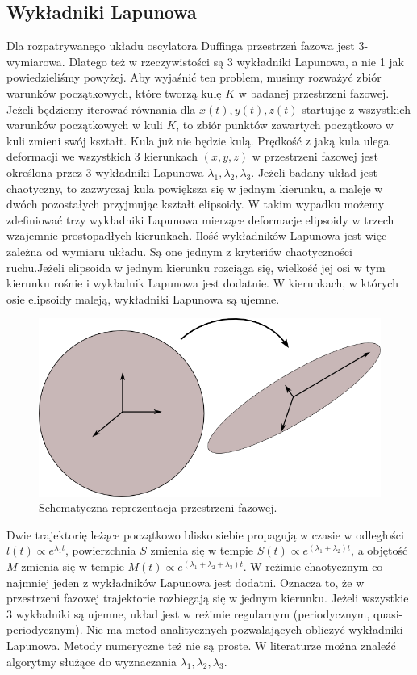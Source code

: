 \documentclass[a4paper,12pt,polish]{sphinxmanual}
\begin{document}
\subsection{Wykładniki Lapunowa}
\label{ch2/chII012:wykladniki-lapunowa}
Dla rozpatrywanego układu oscylatora Duffinga przestrzeń fazowa jest 3-wymiarowa. Dlatego też w rzeczywistości są 3 wykładniki Lapunowa, a nie 1 jak powiedzieliśmy powyżej.  Aby wyjaśnić ten problem, musimy rozważyć  zbiór warunków początkowych, które tworzą  kulę  $K$ w  badanej przestrzeni fazowej.  Jeżeli będziemy iterować równania dla $x(t), y(t), z(t)$ startując z wszystkich warunków początkowych w kuli $K$,  to zbiór punktów zawartych początkowo w kuli zmieni swój kształt. Kula już nie będzie kulą. Prędkość z jaką  kula ulega deformacji we wszystkich 3 kierunkach $(x, y, z)$ w przestrzeni fazowej  jest określona przez 3 wykładniki Lapunowa $\lambda_1, \lambda_2, \lambda_3$. Jeżeli badany układ jest chaotyczny, to zazwyczaj kula powiększa się w jednym kierunku, a maleje w dwóch pozostałych przyjmując kształt elipsoidy. W takim wypadku możemy zdefiniować trzy wykładniki Lapunowa mierzące deformacje elipsoidy w trzech wzajemnie prostopadłych kierunkach. Ilość wykładników Lapunowa jest więc zależna od wymiaru układu. Są one jednym z kryteriów chaotyczności ruchu.Jeżeli elipsoida w jednym kierunku rozciąga się, wielkość jej osi w tym kierunku rośnie i wykładnik Lapunowa jest dodatnie. W kierunkach, w których osie elipsoidy maleją, wykładniki Lapunowa są ujemne.
\begin{figure}[htbp]
\centering
\capstart

\includegraphics[width=0.500\linewidth]{phspace.png}
\caption{Schematyczna reprezentacja przestrzeni fazowej.}\end{figure}

Dwie trajektorię leżące początkowo blisko siebie propagują w czasie w odległości   $l(t)   \propto e^{\lambda_1 t}$, powierzchnia  $S$ zmienia się w tempie $S(t)  \propto e^{(\lambda_1 + \lambda_2) t}$, a objętość  $M$ zmienia się w tempie $M(t)  \propto e^{(\lambda_1 + \lambda_2 + \lambda_3) t}$. W reżimie chaotycznym co najmniej jeden z wykładników Lapunowa jest dodatni. Oznacza to, że w przestrzeni fazowej trajektorie rozbiegają się w jednym kierunku. Jeżeli wszystkie 3 wykładniki są ujemne, układ jest w reżimie regularnym (periodycznym, quasi-periodycznym). Nie ma metod analitycznych pozwalających obliczyć wykładniki Lapunowa. Metody numeryczne też nie są proste. W literaturze można znaleźć algorytmy służące do wyznaczania $\lambda_1, \lambda_2, \lambda_3$.
\end{document}
